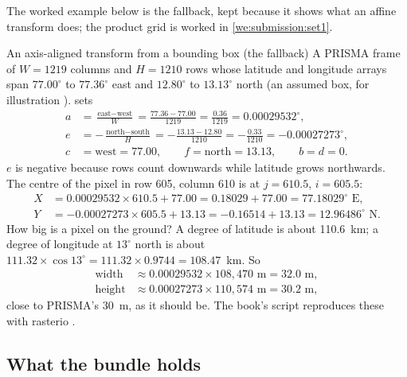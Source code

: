 The worked example below is the fallback, kept because it shows what an affine transform does; the product grid is
worked in \cref{we:submission:set1}.

\begin{worked}[label={we:material:georef}]{An axis-aligned transform from a bounding box (the fallback)}
A PRISMA frame of $W=1219$ columns and $H=1210$ rows whose latitude and longitude arrays span
$77.00^\circ$ to $77.36^\circ$ east and $12.80^\circ$ to $13.13^\circ$ north (an assumed box, for
illustration \tagA).  sets
\begin{align*}
a &= \frac{\text{east}-\text{west}}{W} = \frac{77.36-77.00}{1219} = \frac{0.36}{1219} = 0.00029532^\circ,\\
e &= -\frac{\text{north}-\text{south}}{H} = -\frac{13.13-12.80}{1210} = -\frac{0.33}{1210} = -0.00027273^\circ,\\
c &= \text{west} = 77.00, \qquad f = \text{north} = 13.13, \qquad b=d=0.
\end{align*}
$e$ is negative because rows count downwards while latitude grows northwards. The centre of the pixel in row
605, column 610 is at $j=610.5$, $i=605.5$:
\begin{align*}
X &= 0.00029532\times610.5+77.00 = 0.18029+77.00 = 77.18029^\circ\text{ E},\\
Y &= -0.00027273\times605.5+13.13 = -0.16514+13.13 = 12.96486^\circ\text{ N}.
\end{align*}
How big is a pixel on the ground? A degree of latitude is about 110.6~km; a degree of longitude at
$13^\circ$ north is about $111.32\times\cos13^\circ=111.32\times0.9744=108.47$~km. So
\begin{align*}
\text{width} &\approx 0.00029532\times108{,}470\text{ m} = 32.0\text{ m},\\
\text{height} &\approx 0.00027273\times110{,}574\text{ m} = 30.2\text{ m},
\end{align*}
close to PRISMA's 30~m, as it should be. The book's script reproduces these with rasterio \tagC.
\end{worked}

\subsection{What the bundle holds}

